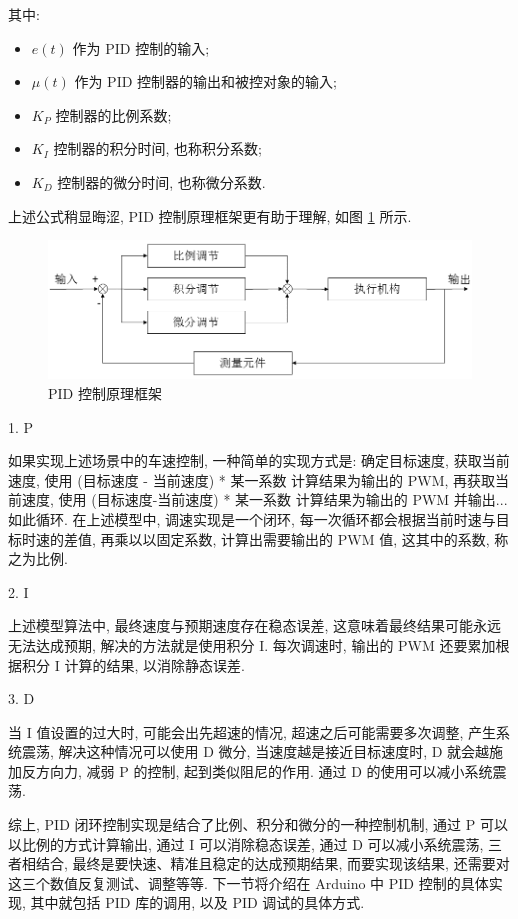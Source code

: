 \documentclass[openany, fontset=windowsold]{ctexbook}
\theoremstyle{kaiti}
\theoremstyle{normal}
\begin{document}
其中:

\begin{itemize}
  \item $e(t)$ 作为 PID 控制的输入; 
  \item $\mu(t)$ 作为 PID 控制器的输出和被控对象的输入; 
  \item $K_P$ 控制器的比例系数; 
  \item $K_I$ 控制器的积分时间, 也称积分系数; 
  \item $K_D$ 控制器的微分时间, 也称微分系数.
\end{itemize}

上述公式稍显晦涩, PID 控制原理框架更有助于理解, 如图 \ref{fig:PID} 所示.

\begin{figure}[!ht]
  \centering
  \includegraphics[width=.9\textwidth]{PID.png}
  \caption{PID 控制原理框架}
  \label{fig:PID}
\end{figure}

1. P

如果实现上述场景中的车速控制, 一种简单的实现方式是: 确定目标速度, 获取当前速度, 使用 (目标速度 - 当前速度) * 某一系数 计算结果为输出的 PWM, 再获取当前速度, 使用 (目标速度-当前速度) * 某一系数 计算结果为输出的 PWM 并输出... 如此循环. 在上述模型中, 调速实现是一个闭环, 每一次循环都会根据当前时速与目标时速的差值, 再乘以以固定系数, 计算出需要输出的 PWM 值, 这其中的系数, 称之为比例.

2. I

上述模型算法中, 最终速度与预期速度存在稳态误差, 这意味着最终结果可能永远无法达成预期, 解决的方法就是使用积分 I. 每次调速时, 输出的 PWM 还要累加根据积分 I 计算的结果, 以消除静态误差.

3. D

当 I 值设置的过大时, 可能会出先超速的情况, 超速之后可能需要多次调整, 产生系统震荡, 解决这种情况可以使用 D 微分, 当速度越是接近目标速度时, D 就会越施加反方向力, 减弱 P 的控制, 起到类似阻尼的作用. 通过 D 的使用可以减小系统震荡.

综上, PID 闭环控制实现是结合了比例、积分和微分的一种控制机制, 通过 P 可以以比例的方式计算输出, 通过 I 可以消除稳态误差, 通过 D 可以减小系统震荡, 三者相结合, 最终是要快速、精准且稳定的达成预期结果, 而要实现该结果, 还需要对这三个数值反复测试、调整等等. 下一节将介绍在 Arduino 中 PID 控制的具体实现, 其中就包括 PID 库的调用, 以及 PID 调试的具体方式.
\end{document}
